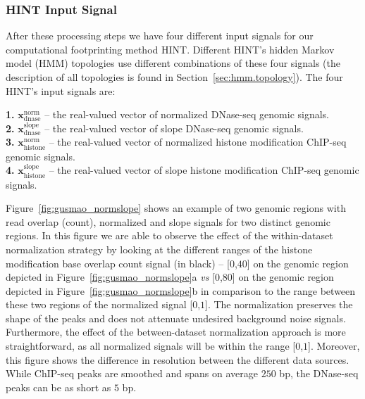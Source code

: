 \subsubsection{HINT Input Signal}

After these processing steps we have four different input signals for our computational footprinting method HINT. Different HINT's hidden Markov model (HMM) topologies use different combinations of these four signals (the description of all topologies is found in Section~\ref{sec:hmm.topology}). The four HINT's input signals are:

\vspace{0.3cm}
\noindent
\textbf{1.} $\mathbf{x}^{\text{norm}}_{\text{dnase}}$ -- the real-valued vector of normalized DNase-seq genomic signals. \vspace{0.2cm} \\
\textbf{2.} $\mathbf{x}^{\text{slope}}_{\text{dnase}}$ -- the real-valued vector of slope DNase-seq genomic signals. \vspace{0.2cm} \\
\textbf{3.} $\mathbf{x}^{\text{norm}}_{\text{histone}}$ -- the real-valued vector of normalized histone modification ChIP-seq genomic signals. \vspace{0.2cm} \\
\textbf{4.} $\mathbf{x}^{\text{slope}}_{\text{histone}}$ -- the real-valued vector of slope histone modification ChIP-seq genomic signals. \\
\vspace{0.3cm}

Figure~\ref{fig:gusmao_normslope} shows an example of two genomic regions with read overlap (count), normalized and slope signals for two distinct genomic regions. In this figure we are able to observe the effect of the within-dataset normalization strategy by looking at the different ranges of the histone modification base overlap count signal (in black) -- [$0$,$40$] on the genomic region depicted in Figure~\ref{fig:gusmao_normslope}a \emph{vs} [$0$,$80$] on the genomic region depicted in Figure~\ref{fig:gusmao_normslope}b in comparison to the range between these two regions of the normalized signal [$0$,$1$]. The normalization preserves the shape of the peaks and does not attenuate undesired background noise signals. Furthermore, the effect of the between-dataset normalization approach is more straightforward, as all normalized signals will be within the range [$0$,$1$]. Moreover, this figure shows the difference in resolution between the different data sources. While ChIP-seq peaks are smoothed and spans on average $250$ bp, the DNase-seq peaks can be as short as $5$ bp.

